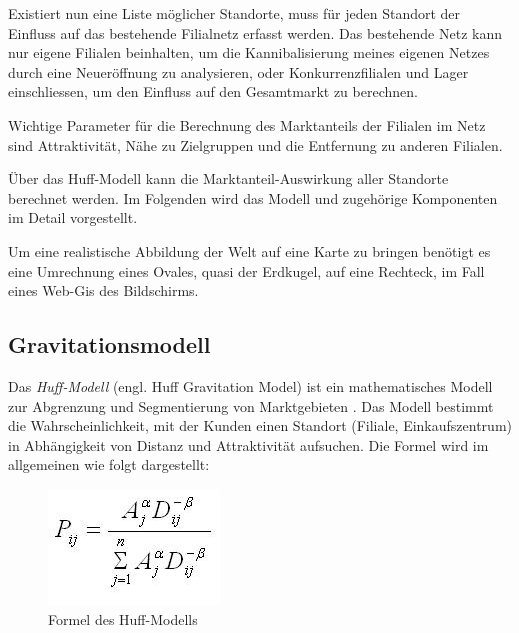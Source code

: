 Existiert nun eine Liste möglicher Standorte, muss für jeden Standort der Einfluss auf das bestehende Filialnetz erfasst werden.
Das bestehende Netz kann nur eigene Filialen beinhalten, um die Kannibalisierung meines eigenen Netzes durch eine Neueröffnung zu analysieren, oder Konkurrenzfilialen und Lager einschliessen, um den Einfluss auf den Gesamtmarkt zu berechnen.

Wichtige Parameter für die Berechnung des Marktanteils der Filialen im Netz sind Attraktivität, Nähe zu Zielgruppen und die Entfernung zu anderen Filialen.

Über das Huff-Modell kann die Marktanteil-Auswirkung aller Standorte berechnet werden.
Im Folgenden wird das Modell und zugehörige Komponenten im Detail vorgestellt.



Um eine realistische Abbildung der Welt auf eine Karte zu bringen benötigt es eine Umrechnung eines Ovales, quasi der Erdkugel, auf eine Rechteck, im Fall eines Web-Gis des Bildschirms. 
\subsection{Gravitationsmodell}
Das \textit{Huff-Modell} (engl. Huff Gravitation Model) ist ein mathematisches Modell zur Abgrenzung und Segmentierung von Marktgebieten \cite{Roy2004}.
Das Modell bestimmt die Wahrscheinlichkeit, mit der Kunden einen Standort (Filiale, Einkaufszentrum) in Abhängigkeit von Distanz und Attraktivität aufsuchen. 
Die Formel wird im allgemeinen wie folgt dargestellt:

\begin{figure}
	\centering
	\includegraphics[]{resources/images/huff_model.jpg}
	\caption{Formel des Huff-Modells}
	\label{img:huff_formula}
\end{figure}

